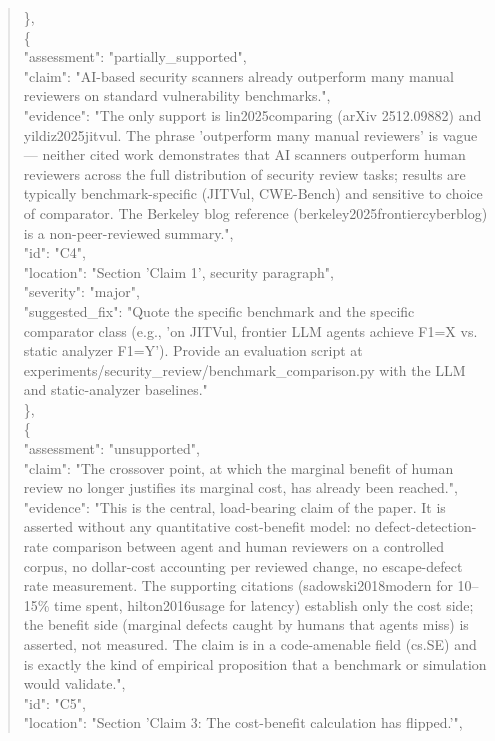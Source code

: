 \documentclass[11pt]{article}
\begin{document}
\begin{quote}
    \},\\
    \{\\
      "assessment": "partially\_supported",\\
      "claim": "AI-based security scanners already outperform many manual reviewers on standard vulnerability benchmarks.",\\
      "evidence": "The only support is lin2025comparing (arXiv 2512.09882) and yildiz2025jitvul. The phrase 'outperform many manual reviewers' is vague --- neither cited work demonstrates that AI scanners outperform human reviewers across the full distribution of security review tasks; results are typically benchmark-specific (JITVul, CWE-Bench) and sensitive to choice of comparator. The Berkeley blog reference (berkeley2025frontiercyberblog) is a non-peer-reviewed summary.",\\
      "id": "C4",\\
      "location": "Section 'Claim 1', security paragraph",\\
      "severity": "major",\\
      "suggested\_fix": "Quote the specific benchmark and the specific comparator class (e.g., 'on JITVul, frontier LLM agents achieve F1=X vs. static analyzer F1=Y'). Provide an evaluation script at experiments/security\_review/benchmark\_comparison.py with the LLM and static-analyzer baselines."\\
    \},\\
    \{\\
      "assessment": "unsupported",\\
      "claim": "The crossover point, at which the marginal benefit of human review no longer justifies its marginal cost, has already been reached.",\\
      "evidence": "This is the central, load-bearing claim of the paper. It is asserted without any quantitative cost-benefit model: no defect-detection-rate comparison between agent and human reviewers on a controlled corpus, no dollar-cost accounting per reviewed change, no escape-defect rate measurement. The supporting citations (sadowski2018modern for 10--15\% time spent, hilton2016usage for latency) establish only the cost side; the benefit side (marginal defects caught by humans that agents miss) is asserted, not measured. The claim is in a code-amenable field (cs.SE) and is exactly the kind of empirical proposition that a benchmark or simulation would validate.",\\
      "id": "C5",\\
      "location": "Section 'Claim 3: The cost-benefit calculation has flipped.'",\\

\end{quote}
\end{document}
